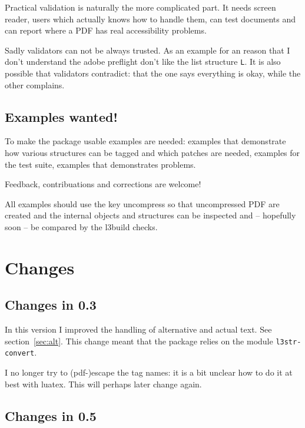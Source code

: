 \documentclass[DIV=12,parskip=half-,bibliography=totoc]{scrartcl}
\newcommand\PrintKeyName[1]{\textsf{#1}}
\newcommand\PDF{PDF}
\begin{document}
Practical validation is naturally the more complicated part. It needs screen reader, users which actually knows how to handle them, can test documents and can report where a \PDF{} has real accessibility problems.



Sadly validators can not be always trusted. As an example for an reason that I don't understand the adobe preflight don't like the list structure \texttt{L}.
It is also possible that validators contradict: that the one says everything is okay, while the other complains.



\subsection{Examples wanted!}


To make the package usable examples are needed: examples that demonstrate how various structures can be tagged and which patches are needed, examples for the test suite, examples that demonstrates problems.


\begin{tcolorbox}[before upper=\tagpdfparaOn]
Feedback, contribuations and corrections are welcome!
\end{tcolorbox}


All examples should use the  key \PrintKeyName{uncompress}
so that uncompressed \PDF{} are created and the internal objects and structures can be inspected and -- hopefully soon -- be compared by the l3build checks.%


\section{Changes}
\subsection{Changes in 0.3}


In this version I improved the handling of alternative and actual text. See section~\ref{sec:alt}. This change meant that the package relies on the module \texttt{l3str-convert}.

I no longer try to (pdf-)escape the tag names: it is a bit unclear how to do it at best with luatex. This will perhaps later change again.


\subsection{Changes in 0.5}
\end{document}
